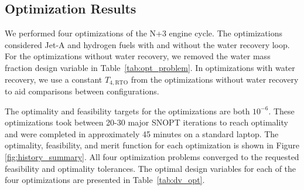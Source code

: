 \documentclass[conf]{new-aiaa}
\begin{document}
\subsection{Optimization Results}
\label{sub:opt_res}


We performed four optimizations of the N+3 engine cycle.
The optimizations considered Jet-A and hydrogen fuels with and without the water recovery loop.
For the optimizations without water recovery, we removed the water mass fraction design variable in Table~\ref{tab:opt_problem}.
In optimizations with water recovery, we use a constant $T_{4,\text{RTO}}$ from the optimizations without water recovery to aid comparisons between configurations.

The optimality and feasibility targets for the optimizations are both $10^{-6}$.
These optimizations took between 20-30 major SNOPT iterations to reach optimality and were completed in approximately 45 minutes on a standard laptop.
The optimality, feasibility, and merit function for each optimization is shown in Figure \ref{fig:history_summary}.
All four optimization problems converged to the requested feasibility and optimality tolerances.
The optimal design variables for each of the four optimizations are presented in Table~\ref{tab:dv_opt}.
\end{document}
